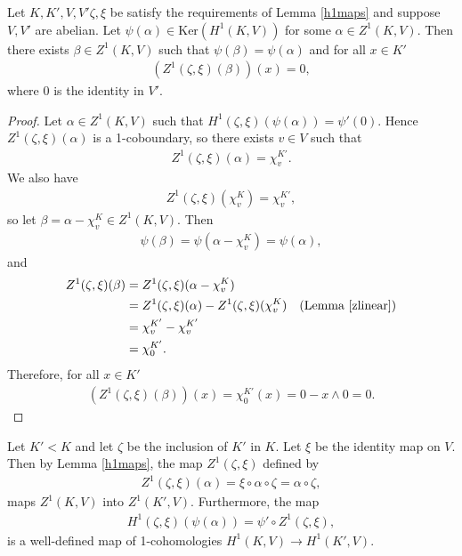 \begin{corollary}\label{kerh1} Let $K, K', V, V' \zeta, \xi$ be satisfy the requirements of Lemma \ref{h1maps} and suppose $V, V'$ are abelian.
Let $\psi(\alpha) \in \mathrm{Ker}\left(H^1(K, V)\right)$ for some $\alpha \in Z^1(K, V)$. Then there exists $\beta \in Z^1(K, V)$ such that $\psi(\beta) = \psi(\alpha)$ and for all $x \in K'$
\begin{align*}
	\left(Z^1(\zeta, \xi)(\beta)\right)(x) = 0,
\end{align*}
where $0$ is the identity in $V'$.
\end{corollary}
\begin{proof}
	Let $\alpha \in Z^1(K, V)$ such that $H^1(\zeta, \xi)(\psi(\alpha)) = \psi'(0)$. Hence $Z^1(\zeta, \xi)(\alpha)$ is a 1-coboundary, so there exists $v \in V$ such that
\begin{align*}
	Z^1(\zeta, \xi)(\alpha) = \chi^{K'}_v.
\end{align*}
We also have
\begin{align*}
	Z^1(\zeta, \xi)(\chi^K_v) = \chi^{K'}_v ,
\end{align*}
so let $\beta = \alpha - \chi^K_v \in Z^1(K, V)$. Then
\begin{align*}
	\psi(\beta) = \psi(\alpha - \chi^K_v) = \psi(\alpha),
	\end{align*}
	and
	\begin{align*}
		Z^1(\zeta, \xi)(\beta) &= Z^1(\zeta, \xi)(\alpha - \chi^K_v) \\
			&= Z^1(\zeta, \xi)(\alpha) - Z^1(\zeta, \xi)(\chi^K_v) \quad(\textrm{Lemma }\ref{zlinear})\\
			&= \chi^{K'}_v - \chi^{K'}_v \\
			&= \chi^{K'}_0.
	\end{align*}
Therefore, for all $x \in K'$
\begin{align*}
	\left(Z^1(\zeta, \xi)(\beta)\right)(x) = \chi^{K'}_0(x) = 0 - x \wedge 0 = 0.
\end{align*}
\end{proof}

\begin{example} \label{h1subgp}
	Let $K' < K$ and let $\zeta$ be the inclusion of $K'$ in $K$. Let $\xi$ be the identity map on $V$. Then by Lemma \ref{h1maps}, the map $Z^1(\zeta, \xi)$ defined by
\begin{align*}
	Z^1(\zeta, \xi)(\alpha) = \xi \circ \alpha \circ \zeta = \alpha \circ \zeta,
\end{align*}
maps $Z^1(K, V)$ into $Z^1(K', V)$. Furthermore, the map
\begin{align*}
	H^1(\zeta, \xi)(\psi(\alpha)) = \psi' \circ Z^1(\zeta, \xi),
\end{align*}
is a well-defined map of 1-cohomologies $H^1(K, V) \rightarrow H^1(K', V)$.
\end{example}

